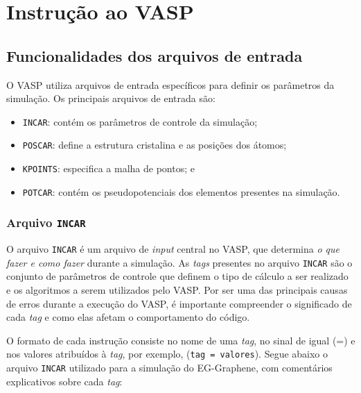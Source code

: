 \section{Instrução ao VASP}

\subsection{Funcionalidades dos arquivos de entrada}
O VASP utiliza arquivos de entrada específicos para definir os
parâmetros da simulação. Os principais arquivos de entrada são:

\begin{itemize}
    \item \texttt{INCAR}: contém os parâmetros de controle da simulação;
    \item \texttt{POSCAR}: define a estrutura cristalina e as posições
      dos átomos;
    \item \texttt{KPOINTS}: especifica a malha de pontos; e
    \item \texttt{POTCAR}: contém os pseudopotenciais dos elementos
      presentes na simulação.
\end{itemize}

\subsubsection{Arquivo \texttt{INCAR}}
O arquivo \texttt{INCAR} é um arquivo de \textit{input} central no VASP, que determina \emph{o que
fazer e como fazer} durante a simulação. As \textit{tags} presentes no arquivo \texttt{INCAR} são o
conjunto de parâmetros de controle que definem o tipo de cálculo a ser realizado e os algoritmos a
serem utilizados pelo VASP\@. Por ser uma das principais causas de erros durante a execução do VASP, é
importante compreender o significado de cada \textit{tag} e como elas afetam o comportamento do código.

O formato de cada instrução consiste no nome de uma \textit{tag}, no sinal de igual (=) e nos valores
atribuídos à \textit{tag}, por exemplo, (\texttt{tag = valores}). Segue abaixo o arquivo
\texttt{INCAR} utilizado para a simulação do EG-Graphene, com comentários explicativos sobre cada \textit{tag}:

